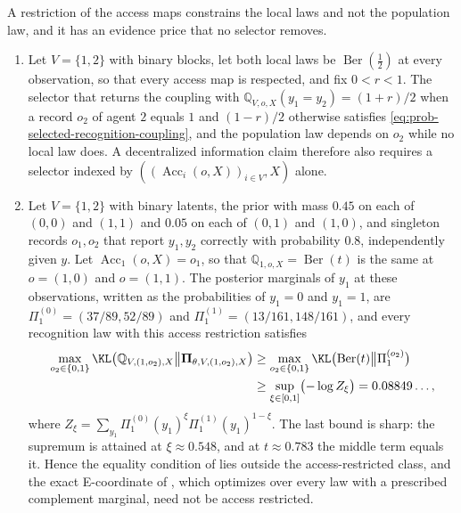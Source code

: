A restriction of the access maps constrains the local laws and not the population law, and it has an
evidence price that no selector removes.
\begin{enumerate}
\item[(i)] Let $V=\{1,2\}$ with binary blocks, let both local laws be $\operatorname{Ber}(\tfrac12)$ at every
observation, so that every access map is respected, and fix $0<r<1$. The selector that returns the
coupling with $\mathbb Q_{V,o,X}(y_1=y_2)=(1+r)/2$ when a record $o_2$ of agent $2$ equals $1$ and
$(1-r)/2$ otherwise satisfies \eqref{eq:prob-selected-recognition-coupling}, and the population law
depends on $o_2$ while no local law does. A decentralized information claim therefore also requires a
selector indexed by $((\operatorname{Acc}_i(o,X))_{i\in V},X)$ alone.
\item[(ii)] Let $V=\{1,2\}$ with binary latents, the prior with mass $0.45$ on each of $(0,0)$ and $(1,1)$
and $0.05$ on each of $(0,1)$ and $(1,0)$, and singleton records $o_1,o_2$ that report $y_1,y_2$
correctly with probability $0.8$, independently given $y$. Let $\operatorname{Acc}_1(o,X)=o_1$, so that
$\mathbb Q_{1,o,X}=\operatorname{Ber}(t)$ is the same at $o=(1,0)$ and $o=(1,1)$. The posterior marginals
of $y_1$ at these observations, written as the probabilities of $y_1=0$ and $y_1=1$, are
$\Pi_1^{(0)}=(37/89,52/89)$ and $\Pi_1^{(1)}=(13/161,148/161)$, and
every recognition law with this access restriction satisfies
\begin{equation}
\begin{aligned}
\max_{o_2\in\{0,1\}}\KL\bigl(\mathbb Q_{V,(1,o_2),X}\big\Vert\boldsymbol\Pi_{\theta,V,(1,o_2),X}\bigr)
&\geq\max_{o_2\in\{0,1\}}\KL\bigl(\operatorname{Ber}(t)\big\Vert\Pi_1^{(o_2)}\bigr)\\
&\geq\sup_{\xi\in[0,1]}\bigl(-\log Z_\xi\bigr)=0.08849\ldots,
\end{aligned}
\label{eq:prob-access-gap-floor}
\end{equation}
where $Z_\xi=\sum_{y_1}\Pi_1^{(0)}(y_1)^\xi\Pi_1^{(1)}(y_1)^{1-\xi}$. The last bound is sharp: the supremum
is attained at $\xi\approx0.548$, and at $t\approx0.783$ the middle term equals it. Hence the equality
condition of  lies outside the access-restricted class, and the exact
E-coordinate of , which optimizes over every law with a prescribed
complement marginal, need not be access restricted.
\end{enumerate}

